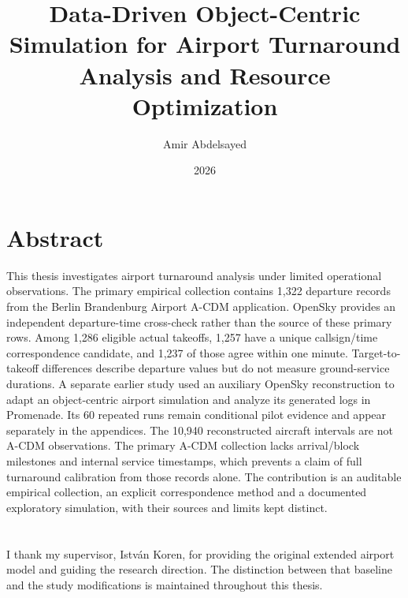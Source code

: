 \documentclass[
]{elteikthesis}[2024/04/26]
\title{Data-Driven Object-Centric Simulation for Airport Turnaround Analysis and Resource Optimization} %
\date{2026} %
\author{Amir Abdelsayed}
\affiliation{Head of Department} %
\begin{document}
\maketitle
\chapter*{Abstract}
This thesis investigates airport turnaround analysis under limited operational observations. The primary empirical collection contains 1,322 departure records from the Berlin Brandenburg Airport A-CDM application. OpenSky provides an independent departure-time cross-check rather than the source of these primary rows. Among 1,286 eligible actual takeoffs, 1,257 have a unique callsign/time correspondence candidate, and 1,237 of those agree within one minute. Target-to-takeoff differences describe departure values but do not measure ground-service durations. A separate earlier study used an auxiliary OpenSky reconstruction to adapt an object-centric airport simulation and analyze its generated logs in Promenade. Its 60 repeated runs remain conditional pilot evidence and appear separately in the appendices. The 10,940 reconstructed aircraft intervals are not A-CDM observations. The primary A-CDM collection lacks arrival/block milestones and internal service timestamps, which prevents a claim of full turnaround calibration from those records alone. The contribution is an auditable empirical collection, an explicit correspondence method and a documented exploratory simulation, with their sources and limits kept distinct.
\cleardoublepage
\tableofcontents
\cleardoublepage

\cleardoublepage

\cleardoublepage

\cleardoublepage

\cleardoublepage

\cleardoublepage

\cleardoublepage
\chapter*{\acklabel}
I thank my supervisor, Istv\'an Koren, for providing the original extended airport model and guiding the research direction. The distinction between that baseline and the study modifications is maintained throughout this thesis.
\cleardoublepage
\appendix

\cleardoublepage

\cleardoublepage
{}
{}
\printbibliography[title=\biblabel]
\cleardoublepage
\listoffigures
\cleardoublepage
\listoftables
\end{document}

